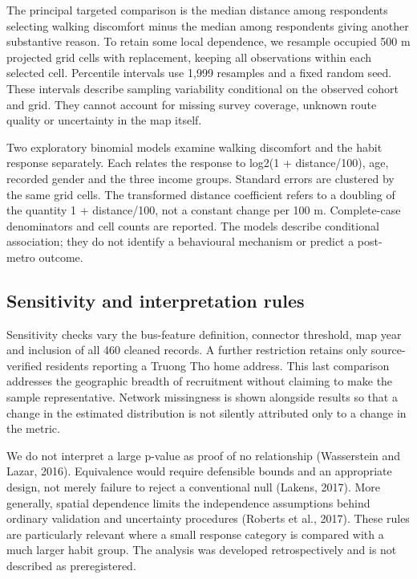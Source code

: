 \documentclass[
  11pt,
  a4paper,
]{article}
\begin{document}
The principal targeted comparison is the median distance among
respondents selecting walking discomfort minus the median among
respondents giving another substantive reason. To retain some local
dependence, we resample occupied 500 m projected grid cells with
replacement, keeping all observations within each selected cell.
Percentile intervals use 1,999 resamples and a fixed random seed. These
intervals describe sampling variability conditional on the observed
cohort and grid. They cannot account for missing survey coverage,
unknown route quality or uncertainty in the map itself.

Two exploratory binomial models examine walking discomfort and the habit
response separately. Each relates the response to log2(1 +
distance/100), age, recorded gender and the three income groups.
Standard errors are clustered by the same grid cells. The transformed
distance coefficient refers to a doubling of the quantity 1 +
distance/100, not a constant change per 100 m. Complete-case
denominators and cell counts are reported. The models describe
conditional association; they do not identify a behavioural mechanism or
predict a post-metro outcome.

\subsection{Sensitivity and interpretation
rules}\label{sensitivity-and-interpretation-rules}

Sensitivity checks vary the bus-feature definition, connector threshold,
map year and inclusion of all 460 cleaned records. A further restriction
retains only source-verified residents reporting a Truong Tho home
address. This last comparison addresses the geographic breadth of
recruitment without claiming to make the sample representative. Network
missingness is shown alongside results so that a change in the estimated
distribution is not silently attributed only to a change in the metric.

We do not interpret a large p-value as proof of no relationship
(Wasserstein and Lazar, 2016). Equivalence would require defensible
bounds and an appropriate design, not merely failure to reject a
conventional null (Lakens, 2017). More generally, spatial dependence
limits the independence assumptions behind ordinary validation and
uncertainty procedures (Roberts et al., 2017). These rules are
particularly relevant where a small response category is compared with a
much larger habit group. The analysis was developed retrospectively and
is not described as preregistered.
\end{document}
